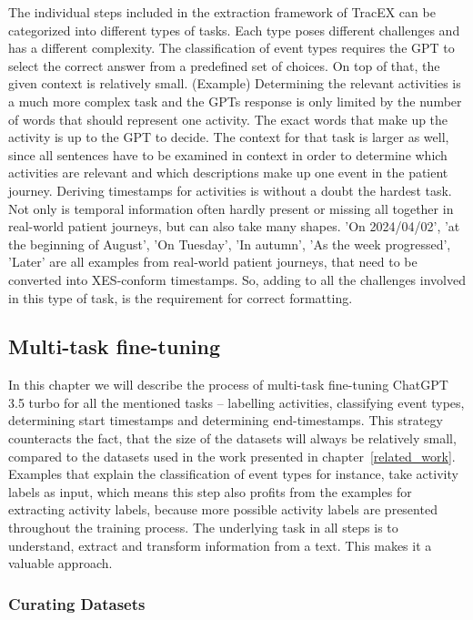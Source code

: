The individual steps included in the extraction framework of TracEX can be categorized into different types of tasks. Each type poses different challenges and has a different complexity. The classification of event types requires the GPT to select the correct answer from a predefined set of choices. On top of that, the given context is relatively small. (Example) Determining the relevant activities is a much more complex task and the GPTs response is only limited by the number of words that should represent one activity. The exact words that make up the activity is up to the GPT to decide. The context for that task is larger as well, since all sentences have to be examined in context in order to determine which activities are relevant and which descriptions make up one event in the patient journey. Deriving timestamps for activities is without a doubt the hardest task. Not only is temporal information often hardly present or missing all together in real-world patient journeys, but can also take many shapes. 'On 2024/04/02', 'at the beginning of August', 'On Tuesday', 'In autumn', 'As the week progressed', 'Later' are all examples from real-world patient journeys, that need to be converted into XES-conform timestamps. So, adding to all the challenges involved in this type of task, is the requirement for correct formatting.

\subsection{Multi-task fine-tuning}\label{sec:multi-task-ft}
In this chapter we will describe the process of multi-task fine-tuning ChatGPT 3.5 turbo for all the mentioned tasks – labelling activities, classifying event types,  determining start timestamps and determining end-timestamps. This strategy counteracts the fact, that the size of the datasets will always be relatively small, compared to the datasets used in the work presented in chapter~\ref{related_work}. Examples that explain the classification of event types for instance, take activity labels as input, which means this step also profits from the examples for extracting activity labels, because more possible activity labels are presented throughout the training process. The underlying task in all steps is to understand, extract and transform information from a text. This makes it a valuable approach.

\subsubsection{Curating Datasets}\label{sec:curating_data}
